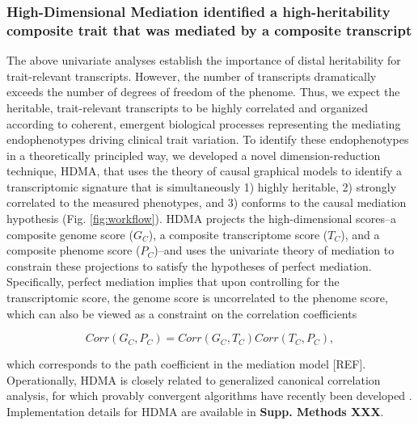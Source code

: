 \documentclass[
]{article}
\begin{document}
\subsubsection{High-Dimensional Mediation identified a high-heritability
composite trait that was mediated by a composite
transcript}\label{high-dimensional-mediation-identified-a-high-heritability-composite-trait-that-was-mediated-by-a-composite-transcript}

The above univariate analyses establish the importance of distal
heritability for trait-relevant transcripts. However, the number of
transcripts dramatically exceeds the number of degrees of freedom of the
phenome. Thus, we expect the heritable, trait-relevant transcripts to be
highly correlated and organized according to coherent, emergent
biological processes representing the mediating endophenotypes driving
clinical trait variation. To identify these endophenotypes in a
theoretically principled way, we developed a novel dimension-reduction
technique, HDMA, that uses the theory of causal graphical models to
identify a transcriptomic signature that is simultaneously 1) highly
heritable, 2) strongly correlated to the measured phenotypes, and 3)
conforms to the causal mediation hypothesis (Fig. \ref{fig:workflow}).
HDMA projects the high-dimensional scores--a composite genome score
(\(G_C\)), a composite transcriptome score (\(T_C\)), and a composite
phenome score (\(P_C\))--and uses the univariate theory of mediation to
constrain these projections to satisfy the hypotheses of perfect
mediation. Specifically, perfect mediation implies that upon controlling
for the transcriptomic score, the genome score is uncorrelated to the
phenome score, which can also be viewed as a constraint on the
correlation coefficients

\begin{equation*}
Corr(G_C,P_C) = Corr(G_C,T_C)Corr(T_C,P_C),
\end{equation*}

which corresponds to the path coefficient in the mediation model
{[}REF{]}. Operationally, HDMA is closely related to generalized
canonical correlation analysis, for which provably convergent algorithms
have recently been developed \cite{rgcca}. Implementation details for
HDMA are available in \textbf{Supp. Methods XXX}.
\end{document}
